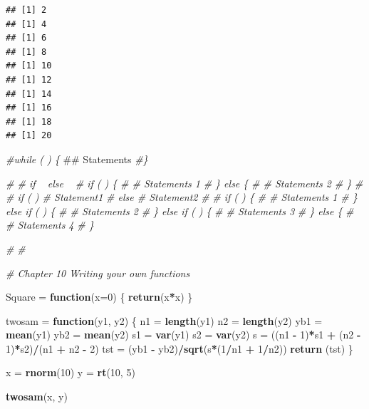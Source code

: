 \documentclass[10pt,]{krantz}
\makeatletter
\newenvironment{Shaded}{\begin{snugshade}}{\end{snugshade}}
\newcommand{\KeywordTok}[1]{\textcolor[rgb]{0.13,0.29,0.53}{\textbf{#1}}}
\newcommand{\DataTypeTok}[1]{\textcolor[rgb]{0.13,0.29,0.53}{#1}}
\newcommand{\DecValTok}[1]{\textcolor[rgb]{0.00,0.00,0.81}{#1}}
\newcommand{\StringTok}[1]{\textcolor[rgb]{0.31,0.60,0.02}{#1}}
\newcommand{\CommentTok}[1]{\textcolor[rgb]{0.56,0.35,0.01}{\textit{#1}}}
\newcommand{\ControlFlowTok}[1]{\textcolor[rgb]{0.13,0.29,0.53}{\textbf{#1}}}
\newcommand{\OperatorTok}[1]{\textcolor[rgb]{0.81,0.36,0.00}{\textbf{#1}}}
\newcommand{\NormalTok}[1]{#1}
\newenvironment{kframe}{%
\medskip{}
\setlength{\fboxsep}{.8em}
 \def\at@end@of@kframe{}%
 \ifinner\ifhmode%
  \def\at@end@of@kframe{\end{minipage}}%
  \begin{minipage}{\columnwidth}%
 \fi\fi%
 \def\FrameCommand##1{\hskip\@totalleftmargin \hskip-\fboxsep
 \colorbox{shadecolor}{##1}\hskip-\fboxsep
     \hskip-\linewidth \hskip-\@totalleftmargin \hskip\columnwidth}%
 \MakeFramed {\advance\hsize-\width
   \@totalleftmargin\z@ \linewidth\hsize
   \@setminipage}}%
 {\par\unskip\endMakeFramed%
 \at@end@of@kframe}
\renewenvironment{Shaded}{\begin{kframe}}{\end{kframe}}
\makeatother
\begin{document}
\begin{verbatim}
## [1] 2
## [1] 4
## [1] 6
## [1] 8
## [1] 10
## [1] 12
## [1] 14
## [1] 16
## [1] 18
## [1] 20
\end{verbatim}

\begin{Shaded}
\begin{Highlighting}[]
\CommentTok{#while (    ) \{}
\NormalTok{## Statements}
\CommentTok{#\}}

\CommentTok{# # if ~ else ~}
\CommentTok{# if (   ) \{}
\CommentTok{# # Statements 1}
\CommentTok{# \} else \{}
\CommentTok{# # Statements 2}
\CommentTok{# \}}
\CommentTok{# }
\CommentTok{# if (    ) # Statement1}
\CommentTok{# else # Statement2}
\CommentTok{# }
\CommentTok{# if (   ) \{}
\CommentTok{# # Statements 1}
\CommentTok{# \} else if (   ) \{}
\CommentTok{# # Statements 2}
\CommentTok{# \} else if (   ) \{}
\CommentTok{# # Statements 3}
\CommentTok{# \} else \{}
\CommentTok{# # Statements 4  }
\CommentTok{# \}}

   
\CommentTok{#}
\CommentTok{#}

\CommentTok{# Chapter 10 Writing your own functions}

\NormalTok{Square =}\StringTok{ }\ControlFlowTok{function}\NormalTok{(}\DataTypeTok{x=}\DecValTok{0}\NormalTok{)}
\NormalTok{\{}
  \KeywordTok{return}\NormalTok{(x}\OperatorTok{*}\NormalTok{x)}
\NormalTok{\}}

\NormalTok{twosam =}\StringTok{ }\ControlFlowTok{function}\NormalTok{(y1, y2) }
\NormalTok{\{}
\NormalTok{  n1  =}\StringTok{ }\KeywordTok{length}\NormalTok{(y1)}
\NormalTok{  n2  =}\StringTok{ }\KeywordTok{length}\NormalTok{(y2)}
\NormalTok{  yb1 =}\StringTok{ }\KeywordTok{mean}\NormalTok{(y1)}
\NormalTok{  yb2 =}\StringTok{ }\KeywordTok{mean}\NormalTok{(y2)}
\NormalTok{  s1  =}\StringTok{ }\KeywordTok{var}\NormalTok{(y1)}
\NormalTok{  s2  =}\StringTok{ }\KeywordTok{var}\NormalTok{(y2) }
\NormalTok{  s   =}\StringTok{ }\NormalTok{((n1 }\OperatorTok{-}\StringTok{ }\DecValTok{1}\NormalTok{)}\OperatorTok{*}\NormalTok{s1 }\OperatorTok{+}\StringTok{ }\NormalTok{(n2 }\OperatorTok{-}\StringTok{ }\DecValTok{1}\NormalTok{)}\OperatorTok{*}\NormalTok{s2)}\OperatorTok{/}\NormalTok{(n1 }\OperatorTok{+}\StringTok{ }\NormalTok{n2 }\OperatorTok{-}\StringTok{ }\DecValTok{2}\NormalTok{)}
\NormalTok{  tst =}\StringTok{ }\NormalTok{(yb1 }\OperatorTok{-}\StringTok{ }\NormalTok{yb2)}\OperatorTok{/}\KeywordTok{sqrt}\NormalTok{(s}\OperatorTok{*}\NormalTok{(}\DecValTok{1}\OperatorTok{/}\NormalTok{n1 }\OperatorTok{+}\StringTok{ }\DecValTok{1}\OperatorTok{/}\NormalTok{n2))}
  \KeywordTok{return}\NormalTok{ (tst)}
\NormalTok{\}}

\NormalTok{x =}\StringTok{ }\KeywordTok{rnorm}\NormalTok{(}\DecValTok{10}\NormalTok{)}
\NormalTok{y =}\StringTok{ }\KeywordTok{rt}\NormalTok{(}\DecValTok{10}\NormalTok{, }\DecValTok{5}\NormalTok{)}

\KeywordTok{twosam}\NormalTok{(x, y)}
\end{Highlighting}
\end{Shaded}
\end{document}
